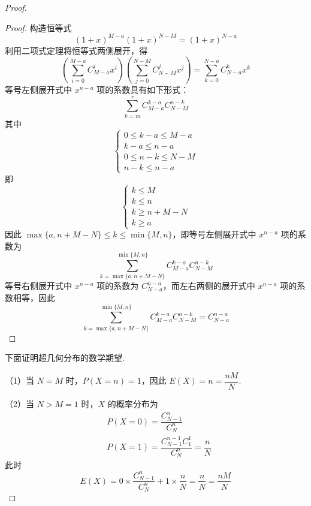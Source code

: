 \begin{proof}
    \begin{proof}
        构造恒等式
        $$
        (1+x)^{M-a} (1+x)^{N-M} = (1+x)^{N-a}
        $$
        利用二项式定理将恒等式两侧展开，得
        $$
        \left( \sum_{i=0}^{M-a} C_{M-a}^i x^i \right) \left( \sum_{j=0}^{N-M} C_{N-M}^j x^j \right) = \sum_{k=0}^{N-a} C_{N-a}^k x^k
        $$
        等号左侧展开式中 $x^{n-a}$ 项的系数具有如下形式：
        $$
        \sum_{k=m}^{r} C_{M-a}^{k-a} C_{N-M}^{n-k}
        $$
        其中
        $$
        \begin{cases}
            0 \leqslant k-a \leqslant M-a \\[-5pt]
            k-a \leqslant n-a \\[-5pt]
            0 \leqslant n-k \leqslant N-M \\[-5pt]
            n-k \leqslant n-a
        \end{cases}
        $$
        即
        $$
        \begin{cases}
            k \leqslant M \\[-5pt]
            k \leqslant n \\[-5pt]
            k \geqslant n+M-N \\[-5pt]
            k \geqslant a
        \end{cases}
        $$
        因此 $\max\{ a, n+M-N \} \leqslant k \leqslant \min\{ M,n \}$，即等号左侧展开式中 $x^{n-a}$ 项的系数为
        $$
        \sum_{k=\max\{ a, n+M-N \}}^{\min\{ M,n \}} C_{M-a}^{k-a} C_{N-M}^{n-k}
        $$
        等号右侧展开式中 $x^{n-a}$ 项的系数为 $C_{N-a}^{n-a}$，而左右两侧的展开式中 $x^{n-a}$ 项的系数相等，因此
        $$
        \sum_{k=\max\{ a, n+M-N \}}^{\min\{ M,n \}} C_{M-a}^{k-a} C_{N-M}^{n-k} = C_{N-a}^{n-a}
        $$

        \vspace{-2em}
    \end{proof}

    下面证明超几何分布的数学期望.

    （1）当 $N=M$ 时，$P(X=n)=1$，因此 $E(X) = n = \dfrac{nM}{N}$.

    （2）当 $N>M=1$ 时，$X$ 的概率分布为
    $$
    \begin{aligned}
        & P(X=0) = \dfrac{C_{N-1}^n}{C_N^n} \\
        & P(X=1) = \dfrac{C_{N-1}^{n-1} C_1^1}{C_N^n} = \dfrac{n}{N}
    \end{aligned}
    $$
    此时
    $$
    E(X) = 0 \times \dfrac{C_{N-1}^n}{C_N^n} + 1 \times \dfrac{n}{N} = \dfrac{n}{N} = \dfrac{nM}{N}
    $$


\end{proof}
